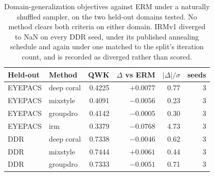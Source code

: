 \begin{table}[t]
\centering
\caption{Domain-generalization objectives against ERM under a naturally shuffled sampler, on the two held-out domains tested. No method clears both criteria on either domain. IRMv1 diverged to NaN on every DDR seed, under its published annealing schedule and again under one matched to the split's iteration count, and is recorded as diverged rather than scored.}
\label{tab:dg}
\begin{tabular}{llrrrr}
\toprule
Held-out & Method & QWK & $\Delta$ vs ERM & $|\Delta|/\sigma$ & seeds \\
\midrule
EYEPACS & deep coral & 0.4225 & $+0.0077$ & 0.77 & 3 \\
EYEPACS & mixstyle & 0.4091 & $-0.0056$ & 0.23 & 3 \\
EYEPACS & groupdro & 0.4142 & $-0.0005$ & 0.30 & 3 \\
EYEPACS & irm & 0.3379 & $\mathbf{-0.0768}$ & 4.73 & 3 \\
DDR & deep coral & 0.7338 & $-0.0046$ & 0.62 & 3 \\
DDR & mixstyle & 0.7444 & $+0.0061$ & 0.44 & 3 \\
DDR & groupdro & 0.7333 & $-0.0051$ & 0.71 & 3 \\
\bottomrule
\end{tabular}
\end{table}
